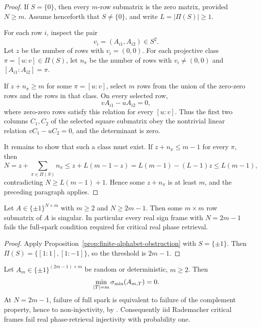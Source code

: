 \begin{proof}
If \(S=\{0\}\), then every \(m\)-row submatrix is the zero matrix, provided
\(N\ge m\).  Assume henceforth that \(S\ne\{0\}\), and write
\(L=|\Pi(S)|\ge1\).

For each row \(i\), inspect the pair
\[
  v_i=(A_{i1},A_{i2})\in S^2.
\]
Let \(z\) be the number of rows with \(v_i=(0,0)\).  For each projective class
\(\pi=[u:v]\in\Pi(S)\), let \(n_\pi\) be the number of rows with
\(v_i\ne(0,0)\) and \([A_{i1}:A_{i2}]=\pi\).

If \(z+n_\pi\ge m\) for some \(\pi=[u:v]\), select \(m\) rows from the union of
the zero-zero rows and the rows in that class.  On every selected row,
\[
  vA_{i1}-uA_{i2}=0,
\]
where zero-zero rows satisfy this relation for every \([u:v]\).  Thus the first
two columns \(C_1,C_2\) of the selected square submatrix obey the nontrivial
linear relation \(vC_1-uC_2=0\), and the determinant is zero.

It remains to show that such a class must exist.  If \(z+n_\pi\le m-1\) for
every \(\pi\), then
\[
  N=z+\sum_{\pi\in\Pi(S)}n_\pi
  \le z+L(m-1-z)
  =L(m-1)-(L-1)z
  \le L(m-1),
\]
contradicting \(N\ge L(m-1)+1\).  Hence some \(z+n_\pi\) is at least \(m\),
and the preceding paragraph applies.
\end{proof}

\begin{proposition}\label{prop:sign-critical}
Let \(A\in\{\pm1\}^{N\times m}\) with \(m\ge2\) and \(N\ge2m-1\).  Then some
\(m\times m\) row submatrix of \(A\) is singular.  In particular every real
sign frame with \(N=2m-1\) fails the full-spark condition required for critical
real phase retrieval.
\end{proposition}

\begin{proof}
Apply Proposition~\ref{prop:finite-alphabet-obstruction} with
\(S=\{\pm1\}\).  Then
\(\Pi(S)=\{[1:1],[1:-1]\}\), so the threshold is \(2m-1\).
\end{proof}

\begin{corollary}\label{cor:rademacher-pr-fail}
Let \(A_m\in\{\pm1\}^{(2m-1)\times m}\) be random or deterministic, \(m\ge2\).
Then
\[
  \min_{|T|=m}\sigma_{\min}(A_{m,T})=0.
\]
At \(N=2m-1\), failure of full spark is equivalent to failure of the complement
property, hence to non-injectivity, by
\cite{BalanCasazzaEdidin2006,BandeiraCahillMixonNelson2014}.
Consequently iid Rademacher critical frames fail real phase-retrieval
injectivity with probability one.
\end{corollary}

